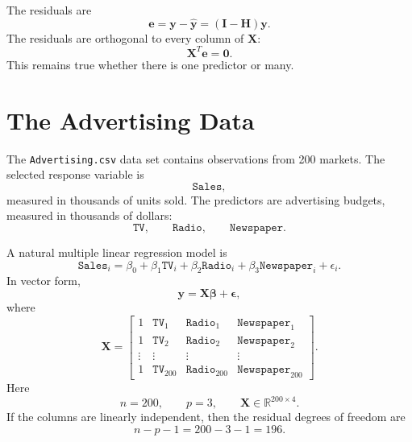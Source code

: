 The residuals are
\begin{equation}
  \mathbf{e}=\mathbf{y}-\widehat{\mathbf{y}}=(\mathbf{I}-\mathbf{H})\mathbf{y}.
\end{equation}
The residuals are orthogonal to every column of \(\mathbf{X}\):
\begin{equation}
  \boxed{\mathbf{X}^T\mathbf{e}=\mathbf{0}.}
\end{equation}
This remains true whether there is one predictor or many.

\section{The Advertising Data}

The \texttt{Advertising.csv} data set contains observations from 200 markets.  The selected response variable is
\begin{equation}
  \texttt{Sales},
\end{equation}
measured in thousands of units sold.  The predictors are advertising budgets, measured in thousands of dollars:
\begin{equation}
  \texttt{TV},\qquad \texttt{Radio},\qquad \texttt{Newspaper}.
\end{equation}

A natural multiple linear regression model is
\begin{equation}
  \texttt{Sales}_i
  =\beta_0
  +\beta_1\texttt{TV}_i
  +\beta_2\texttt{Radio}_i
  +\beta_3\texttt{Newspaper}_i
  +\epsilon_i.
\end{equation}
In vector form,
\begin{equation}
  \mathbf{y}=\mathbf{X}\boldsymbol{\beta}+\boldsymbol{\epsilon},
\end{equation}
where
\begin{equation}
  \mathbf{X}=\begin{bmatrix}
    1 & \texttt{TV}_1 & \texttt{Radio}_1 & \texttt{Newspaper}_1\\
    1 & \texttt{TV}_2 & \texttt{Radio}_2 & \texttt{Newspaper}_2\\
    \vdots & \vdots & \vdots & \vdots\\
    1 & \texttt{TV}_{200} & \texttt{Radio}_{200} & \texttt{Newspaper}_{200}
  \end{bmatrix}.
\end{equation}
Here
\begin{equation}
  n=200,\qquad p=3,\qquad \mathbf{X}\in\mathbb{R}^{200\times 4}.
\end{equation}
If the columns are linearly independent, then the residual degrees of freedom are
\begin{equation}
  n-p-1=200-3-1=196.
\end{equation}

